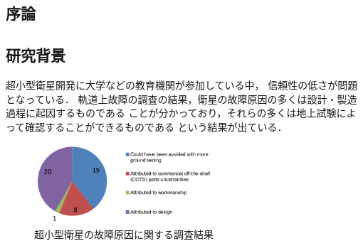 \documentclass[11pt]{jsarticle}%
\begin{document}
\begin{multicols}{2}
  \section{序論}
  \vspace{-1zh}
  \subsection{研究背景}
  \vspace{-1zh}
  超小型衛星開発に大学などの教育機関が参加している中，
  信頼性の低さが問題となっている\cite{}．
  軌道上故障の調査の結果，衛星の故障原因の多くは設計・製造過程に起因するものである
  ことが分かっており，それらの多くは地上試験によって確認することができるものである
  という結果が出ている\cite{}．
 

  \begin{figure}[H]
    \centering
      \includegraphics[height=3.0cm]{../figure/cause_of_failure.png}
      \caption{超小型衛星の故障原因に関する調査結果\cite{Venturini2017}}
      \label{fig:cause_of_failure}
  \end{figure}
  

\end{multicols}
\end{document}
